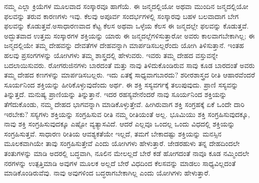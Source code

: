 ನಮ್ಮ ಎಲ್ಲಾ ಕ್ರಿಯೆಗಳ ಮೂಲವಾದ ಸಂಸ್ಕಾರವೂ ಹಾಗೆಯೆ. ಈ ಜನ್ಮದಲ್ಲಿಯೋ ಅಥವಾ ಮುಂದಿನ ಜನ್ಮದಲ್ಲಿಯೋ ಫಲವನ್ನು ತರುವ ಕಾರಣಗಳು ಇವು. ಕೆಲವು ಅಪೂರ್ವ ಸಂದರ್ಭಗಳಲ್ಲಿ ಸಂಸ್ಕಾರವು ಬಹಳ ಬಲವಾದಾಗ ಬೇಗ ಫಲವನ್ನು ಕೊಡುತ್ತವೆ.\break ಅಸಾಧಾರಣವಾದ ಕೆಟ್ಟ ಕೆಲಸ ಅಥವಾ ಒಳ್ಳೆಯ ಕೆಲಸ ಈ ಜನ್ಮದಲ್ಲೇ ಫಲವನ್ನು ಕೊಡುತ್ತವೆ. ಅದ್ಭುತವಾದ ಉತ್ತಮ ಸಂಸ್ಕಾರಗಳ ಶಕ್ತಿಯನ್ನು ಯಾರು ಈ ಜನ್ಮದಲ್ಲೆಗಳಿಸು\break ತ್ತಾರೋ ಅವರು ಕಾಲವಾಗಬೇಕಾಗಿಲ್ಲ; ಈ ಜನ್ಮದಲ್ಲಿಯೇ ತಮ್ಮ ದೇಹವನ್ನು ದೇವತೆಗಳ ದೇಹವನ್ನಾಗಿ ಮಾರ್ಪಡಿಸಬಲ್ಲರೆಂದು ಯೋಗಿ ತಿಳಿಸುತ್ತಾನೆ. ಇಂತಹ ಹಲವು ಪ್ರಸಂಗಗಳನ್ನು ಯೋಗಿಗಳು ತಮ್ಮ ಶಾಸ್ತ್ರದಲ್ಲಿ ಹೇಳುವರು. ಇವರು ತಮ್ಮ ದೇಹದ ವಸ್ತುವನ್ನೇ ಬದಲಾಯಿಸುವರು. ರೋಗರುಜಿನಗಳು ಬಾರದಂತೆ ಮತ್ತು ನಾವು ತಿಳಿದುಕೊಂಡಿರುವ ಸಾವು ಕೂಡ ಬಾರದಂತೆ ಅವರು ತಮ್ಮ ದೇಹದ ಕಣಗಳನ್ನು ಮಾರ್ಪಡಿಸಬಲ್ಲರು. ಇದು ಏತಕ್ಕೆ ಸಾಧ್ಯವಾಗಬಾರದು? ಶರೀರಶಾಸ್ತ್ರದ ರೀತಿ ಆಹಾರವೆಂದರೆ ಸೂರ್ಯನಿಂದ ಶಕ್ತಿಯನ್ನು ಹೀರಿಕೊಳ್ಳುವುದೆಂದು ಅರ್ಥ. ಈ ಶಕ್ತಿ ಸಸ್ಯವರ್ಗಕ್ಕೆ ತಲುಪುವುದು. ಪ್ರಾಣಿ ಸಸ್ಯವನ್ನು ತಿನ್ನುತ್ತದೆ. ಮನುಷ್ಯ ಪ್ರಾಣಿಯನ್ನು ತಿನ್ನುತ್ತಾನೆ. ಇದರ ರಹಸ್ಯವೇನೆಂದರೆ ನಾವು ಸೂರ್ಯನಿಂದ ಶಕ್ತಿಯನ್ನು ತೆಗೆದುಕೊಂಡು, ನಮ್ಮ ದೇಹದ ಭಾಗವನ್ನಾಗಿ ಮಾಡಿಕೊಳ್ಳುತ್ತೇವೆ. ಹೀಗಿರುವಾಗ ಶಕ್ತಿ ಸಂಗ್ರಹಕ್ಕೆ ಏಕೆ ಒಂದೇ ದಾರಿ ಇರಬೇಕು? ಸಸ್ಯಗಳು ಶಕ್ತಿಯನ್ನು ಸಂಗ್ರಹಿಸುವ ರೀತಿ ನಮ್ಮ ರೀತಿಯಂತೆ ಅಲ್ಲ. ಭೂಮಿಯು ಶಕ್ತಿ ಸಂಗ್ರಹಿಸುವುದಕ್ಕೂ, ನಾವು ಶಕ್ತಿ ಸಂಗ್ರಹಿಸುವುದಕ್ಕೂ ಎಷ್ಟೋ ವ್ಯತ್ಯಾಸವಿದೆ. ಆದರೆ ಎಲ್ಲವೂ ಒಂದಲ್ಲ ಒಂದು ವಿಧದಲ್ಲಿ ಶಕ್ತಿಯನ್ನು ಸಂಗ್ರಹಿಸುತ್ತವೆ. ಸಾಧಾರಣ ರೀತಿಯ ಆವಶ್ಯಕತೆಯೇ ಇಲ್ಲದೆ, ತಮಗೆ ಬೇಕಾದಷ್ಟು ಶಕ್ತಿಯನ್ನು ಮನಸ್ಸಿನ ಮೂಲಕವಾಗಿಯೇ ತಾವು ಸಂಗ್ರಹಿಸುತ್ತೇವೆ ಎಂದು ಯೋಗಿಗಳು ಹೇಳುತ್ತಾರೆ. ಜೇಡರಹುಳು ತನ್ನ ದೇಹದಿಂದಲೇ ತಂತುಗಳನ್ನು ಮಾಡಿ ಅದರಲ್ಲಿ ಬದ್ಧವಾಗಿ, ನೂಲಿನ ಮೇಲಲ್ಲದೆ ಬೇರೆ ಕಡೆ ಹೋಗದಂತೆ ನಾವೂ ಕೂಡ ನಮ್ಮಿಂದಲೇ ನರಗಳನ್ನು ಉತ್ಪತ್ತಿಮಾಡಿ ಅವುಗಳ ಮೂಲಕ ಅಲ್ಲದೆ ಬೇರೆ ವಿಧದಿಂದ ಕೆಲಸವನ್ನು ಮಾಡಲು ಸಾಧ್ಯವಿಲ್ಲದಂತೆ ಮಾಡಿಕೊಂಡಿರುವೆವು. ನಾವು ಅವುಗಳಿಂದ ಬದ್ಧರಾಗಬೇಕಾಗಿಲ್ಲ ಎಂದು ಯೋಗಿಗಳು ಹೇಳುತ್ತಾರೆ. 

